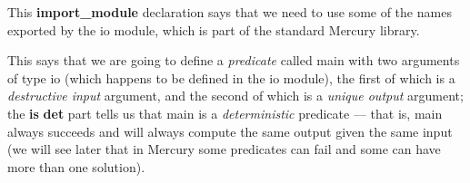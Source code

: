 \documentclass[a4paper,11pt,notitlepage,onecolumn]{book}
\begin{document}
This \textsf{\textbf{import\_module}} declaration says that we need to use some of the names
exported by the \textsf{io} module, which is part of the standard Mercury library.
\begin{small}

\begin{ptabular}
\nextline
\end{ptabular}

\end{small}
This says that we are going to define a \emph{predicate} called \textsf{main} with
two arguments of type \textsf{io} (which happens to be defined in the \textsf{io}
module), the first of which is a \emph{destructive input} argument, and the
second of which is a \emph{unique output} argument; the \textsf{\textbf{is} \textbf{det}} part
tells us that \textsf{main} is a \emph{deterministic} predicate --- that is,
\textsf{main} always succeeds and will always compute the same output given the
same input (we will see later that in Mercury some predicates can fail and
some can have more than one solution).
\end{document}
